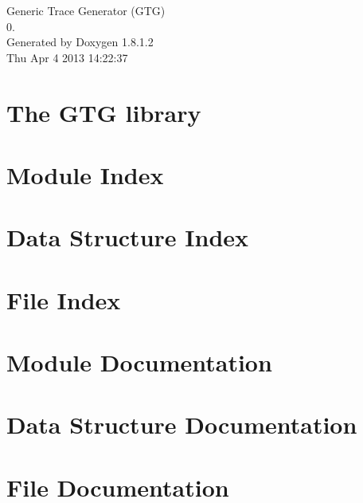 \documentclass{book}
\begin{document}
\hypersetup{pageanchor=false,citecolor=blue}
\begin{titlepage}
\vspace*{7cm}
\begin{center}
{\Large Generic Trace Generator (G\-T\-G) \\[1ex]\large 0. }\\
\vspace*{1cm}
{\large Generated by Doxygen 1.8.1.2}\\
\vspace*{0.5cm}
{\small Thu Apr 4 2013 14:22:37}\\
\end{center}
\end{titlepage}
\clearemptydoublepage
{}
\tableofcontents
\clearemptydoublepage
{}
\hypersetup{pageanchor=true,citecolor=blue}
\chapter{The G\-T\-G library}
\label{index}\hypertarget{index}{}
\chapter{Module Index}

\chapter{Data Structure Index}

\chapter{File Index}

\chapter{Module Documentation}













\chapter{Data Structure Documentation}














\chapter{File Documentation}














\printindex
\end{document}
